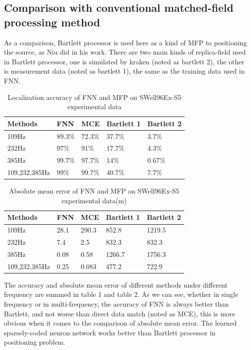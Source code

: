 \subsection{Comparison with conventional matched-field processing method}
As a comparison, Bartlett processor is used here as a kind of MFP to positioning the source, as Niu did in his work. There are two main kinds of replica-field used in Bartlett processor, one is simulated by kraken (noted as bartlett 2), the other is measurement data (noted as bartlett 1), the same as the training data used in FNN.
\begin{table}[]
\caption{Localization accuracy of FNN and MFP on SWell96Ex-S5 experimental data}
\label{my-label}
\begin{tabular}{@{}lllll@{}}
\toprule
Methods       & FNN    & MCE    & Bartlett 1 & Bartlett 2 \\ \midrule
109Hz         & 89.3\% & 72.3\% & 37.7\%     & 3.7\%      \\
232Hz         & 97\%   & 91\%   & 17.7\%     & 4.3\%      \\
385Hz         & 99.7\% & 97.7\% & 14\%       & 0.67\%     \\
109,232,385Hz & 99\%   & 99.7\% & 40.7\%     & 7.7\%      \\ \bottomrule
\end{tabular}
\end{table}
\begin{table}[]
\caption{Absolute mean error of FNN and MFP on SWell96Ex-S5 experimental data(m)}
\label{my-label}
\begin{tabular}{@{}lllll@{}}
\toprule
Methods       & FNN  & MCE   & Bartlett 1 & Bartlett 2 \\ \midrule
109Hz         & 28.1 & 290.3 & 852.8      & 1219.5     \\
232Hz         & 7.4  & 2.5   & 832.3      & 832.3      \\
385Hz         & 0.08 & 0.58  & 1266.7     & 1756.3     \\
109,232,385Hz & 0.25 & 0.083 & 477.2      & 722.9      \\ \bottomrule
\end{tabular}
\end{table}
The accuracy and absolute mean error of different methods under different frequency are summed in table 1 and table 2. As we can see, whether in single frequency or in multi-frequency, the accuracy of FNN is always better than Bartlett, and not worse than direct data match (noted as MCE), this is more obvious when it comes to the comparison of absolute mean error.
The learned sparsely-coded neuron network works better than Bartlett processor in positioning problem.
